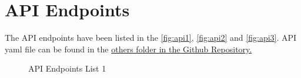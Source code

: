 \newpage
\section{API Endpoints}
The API endpoints have been listed in the \autoref{fig:api1}, \autoref{fig:api2} and \autoref{fig:api3}. API yaml file can be found in the \href{https://github.com/anhatsingh/Software-Engineering-Project-IITM-Sept2023/tree/main/others}{others folder in the Github Repository.}

\begin{figure}[H]
    \centering
    \caption{API Endpoints List 1}
    \label{fig:api1}
\end{figure}
